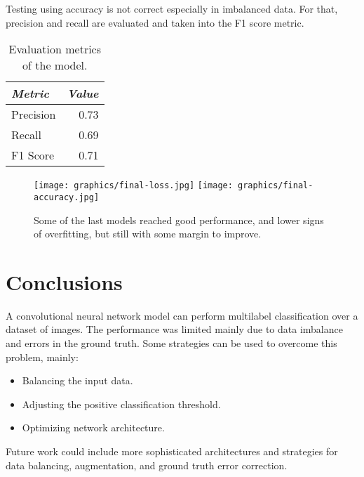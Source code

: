 \documentclass{article}
\begin{document}
Testing using accuracy is not correct especially in imbalanced data.
For that, precision and recall are evaluated and taken into the F1 score metric.

\begin{table}[ht]
  \centering
  \begin{tabular}{l r}
	  {\small \textit{Metric}} & {\small \textit{Value}} \\ \hline
	  Precision                & 0.73                    \\
	  Recall                   & 0.69                    \\
	  F1 Score                 & 0.71                    \\
  \end{tabular}
  \caption{Evaluation metrics of the model.}
\end{table}


\begin{figure}[ht]
  \centering
  \texttt{[image: graphics/final-loss.jpg]}
  \texttt{[image: graphics/final-accuracy.jpg]}
  \caption{Some of the last models reached good performance, and lower signs of overfitting, but still with some margin to improve.}
\end{figure}

\section{Conclusions}
A convolutional neural network model can perform multilabel classification over a dataset of images.
The performance was limited mainly due to data imbalance and errors in the ground truth.
Some strategies can be used to overcome this problem, mainly:

\begin{itemize}
  \item Balancing the input data.
  \item Adjusting the positive classification threshold.
  \item Optimizing network architecture.
\end{itemize}

Future work could include more sophisticated architectures and strategies for data balancing, augmentation, and ground truth error correction.
\end{document}
